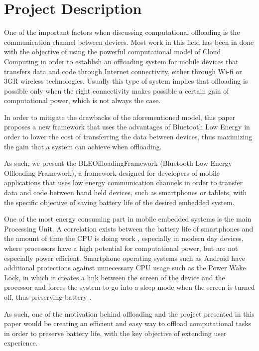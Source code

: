 \section{Project Description}
\label{projectdescription}

One of the important factors when discussing computational offloading is the communication channel between devices. Most work in this field has been in done with the objective of using the powerful computational model of Cloud Computing\cite{kumar2010cloud} in order to establish an offloading system for mobile devices that transfers data and code through Internet connectivity, either through Wi-fi or 3GR wireless technologies. Usually this type of system implies that offloading is possible only when the right connectivity makes possible a certain gain of computational power, which is not always the case.

In order to mitigate the drawbacks of the aforementioned model, this paper proposes a new framework that uses the advantages of Bluetooth Low Energy in order to lower the cost of transferring the data between devices, thus maximizing the gain that a system can achieve when offloading.

As such, we present the BLEOffloadingFramework (Bluetooth Low Energy Offloading Framework), a framework designed for developers of mobile applications that uses low energy communication channels in order to transfer data and code between hand held devices, such as smartphones or tablets, with the specific objective of saving battery life of the desired embedded system.

One of the most energy consuming part in mobile embedded systems is the main Processing Unit. A correlation exists between the battery life of smartphones and the amount of time the CPU is doing work \cite{ferreira2011understanding}, especially in modern day devices, where processors have a high potential for computational power, but are not especially power efficient. Smartphone operating systems such as Android have additional protections against unnecessary CPU usage such as the Power Wake Lock, in which it creates a link between the screen of the device and the processor and forces the system to go into a sleep mode when the screen is turned off, thus preserving battery \cite{datta2012android}.

As such, one of the motivation behind offloading and the project presented in this paper would be creating an efficient and easy way to offload computational tasks in order to preserve battery life, with the key objective of extending user experience.


